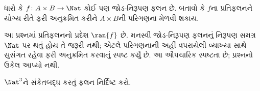 \begin{prob}
ધારો કે $f \colon A \times B \to \Nat$ કોઈ પણ
જોડ-નિરૂપણ ફલન છે. બતાવો કે $f$ના પ્રતિફલનને યોગ્ય રીતે ફરી અનુક્રમિત કરીને
$A \times B$ની પરિગણના મેળવી શકાય.
\begin{editorial}
આ પ્રશ્નમાં પ્રતિફલનનો પ્રદેશ \(\ran{f}\) છે. મનસ્વી જોડ-નિરૂપણ ફલનનું નિરૂપણ સમગ્ર \(\Nat\) પર થતું હોય તે જરૂરી નથી; એટલે પરિગણનાની અહીં વપરાયેલી વ્યાખ્યા સાથે સુસંગત રહેવા ફરી અનુક્રમિત કરવાનું સ્પષ્ટ કર્યું છે. આ ઔપચારિક સ્પષ્ટતા છે; પ્રશ્નનો ઉકેલ આપ્યો નથી.
\end{editorial}
\end{prob}

\begin{prob}
$\Nat^3$ને સંકેતબદ્ધ કરતું ફલન નિર્દિષ્ટ કરો.
\end{prob}
\endgroup


\begingroup
\makeatletter{}\makeatother


\label{guunit:OLP-0032}



